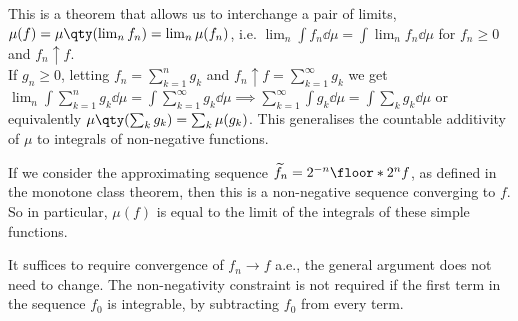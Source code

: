 \begin{remark}
	This is a theorem that allows us to interchange a pair of limits, $\mu(f) = \mu\qty(\lim_n f_n) = \lim_n \mu(f_n)$, i.e. $\lim_n \int f_n \dd{\mu} = \int \lim_n f_n \dd{\mu}$ for $f_n \geq 0$ and $f_n \uparrow f$. \\
	If $g_n \geq 0$, letting $f_n = \sum_{k=1}^{n} g_k$ and $f_n \uparrow f = \sum_{k=1}^{\infty} g_k$ we get $\lim_n \int \sum_{k=1}^{n} g_k \dd{\mu} = \int \sum_{k=1}^\infty g_k \dd{\mu} \implies \sum_{k=1}^{\infty} \int g_k \dd{\mu} = \int \sum_k g_k \dd{\mu}$ or equivalently $\mu\qty(\sum_k g_k) = \sum_k \mu(g_k)$.
	This generalises the countable additivity of $\mu$ to integrals of non-negative functions.

	If we consider the approximating sequence $\widetilde f_n = 2^{-n} \floor*{2^n f}$, as defined in the monotone class theorem, then this is a non-negative sequence converging to $f$.
	So in particular, $\mu(f)$ is equal to the limit of the integrals of these simple functions.

	It suffices to require convergence of $f_n \to f$ a.e., the general argument does not need to change.
	The non-negativity constraint is not required if the first term in the sequence $f_0$ is integrable, by subtracting $f_0$ from every term.
\end{remark}

